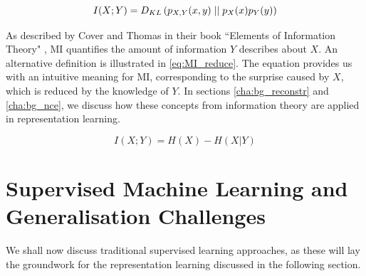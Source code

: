 \begin{equation}
	I(X; Y) =  D_{KL} \left( p_{X, Y}(x, y) \mid \mid p_X(x) p_Y(y) \right)
\end{equation}

As described by Cover and Thomas in their book ``Elements of Information Theory" \citep{coverELEMENTSINFORMATIONTHEORY}, MI quantifies the amount of information $Y$ describes about $X$. An alternative definition is illustrated in \ref{eq:MI_reduce}. The equation provides us with an intuitive meaning for MI, corresponding to the surprise caused by $X$, which is reduced by the knowledge of $Y$. In sections \ref{cha:bg_reconstr} and \ref{cha:bg_nce}, we discuss how these concepts from information theory are applied in representation learning.

\begin{equation}
	I(X;Y)= H(X) - H(X|Y) \label{eq:MI_reduce}
\end{equation}



\section{Supervised Machine Learning and Generalisation Challenges}




We shall now discuss traditional supervised learning approaches, as these will lay the groundwork for the representation learning discussed in the following section. 

